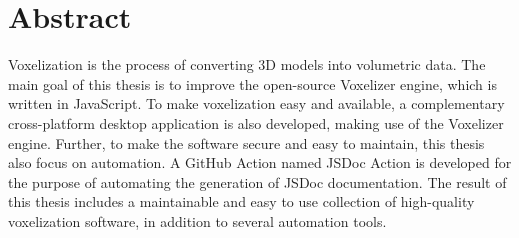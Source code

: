 \section*{Abstract}
Voxelization is the process of converting 3D models into volumetric data. The main goal of this thesis is to improve the open-source Voxelizer engine, which is written in JavaScript. To make voxelization easy and available, a complementary cross-platform desktop application is also developed, making use of the Voxelizer engine. Further, to make the software secure and easy to maintain, this thesis also focus on automation. A GitHub Action named JSDoc Action is developed for the purpose of automating the generation of JSDoc documentation. The result of this thesis includes a maintainable and easy to use collection of high-quality voxelization software, in addition to several automation tools.

